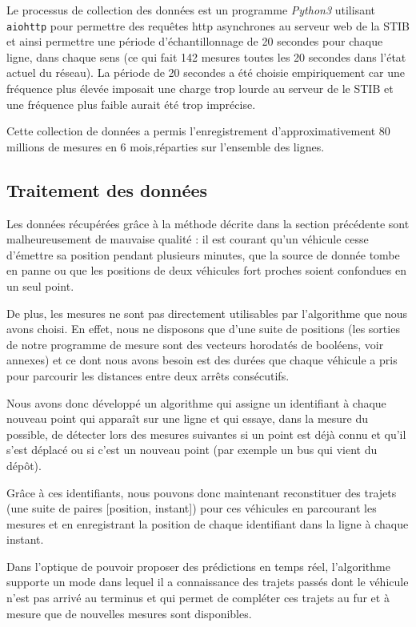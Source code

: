 \documentclass[letterpaper]{article}
\begin{document}
Le processus de collection des données est un programme \textit{Python3} utilisant \texttt{aiohttp} pour permettre des requêtes http asynchrones au serveur web de la STIB et ainsi permettre une période d’échantillonnage de 20 secondes pour chaque ligne, dans chaque sens (ce qui fait 142 mesures toutes les 20 secondes dans l'état actuel du réseau). La période de 20 secondes a été choisie empiriquement car une fréquence plus élevée imposait une charge trop lourde au serveur de le STIB et une fréquence plus faible aurait été trop imprécise.

Cette collection de données a permis l'enregistrement d'approximativement 80 millions de mesures en 6 mois,réparties sur l'ensemble des lignes.


\subsection{Traitement des données}

Les données récupérées grâce à la méthode décrite dans la section précédente sont malheureusement de mauvaise qualité : il est courant qu'un véhicule cesse d’émettre sa position pendant plusieurs minutes, que la source de donnée tombe en panne ou que les positions de deux véhicules fort proches soient confondues en un seul point.

De plus, les mesures ne sont pas directement utilisables par l'algorithme que nous avons choisi. En effet, nous ne disposons que d'une suite de positions (les sorties de notre programme de mesure sont des vecteurs horodatés de booléens, voir annexes) et ce dont nous avons besoin est des durées que chaque véhicule a pris pour parcourir les distances entre deux arrêts consécutifs.

Nous avons donc développé un algorithme qui assigne un identifiant à chaque nouveau point qui apparaît sur une ligne et qui essaye, dans la mesure du possible, de détecter lors des mesures suivantes si un point est déjà connu et qu'il s'est déplacé ou si c'est un nouveau point (par exemple un bus qui vient du dépôt).

Grâce à ces identifiants, nous pouvons donc maintenant reconstituer des trajets (une suite de paires [position, instant]) pour ces véhicules en parcourant les mesures et en enregistrant la position de chaque identifiant dans la ligne à chaque instant.

Dans l'optique de pouvoir proposer des prédictions en temps réel, l'algorithme supporte un mode dans lequel il a connaissance des trajets passés dont le véhicule n'est pas arrivé au terminus et qui permet de compléter ces trajets au fur et à mesure que de nouvelles mesures sont disponibles.
\end{document}
